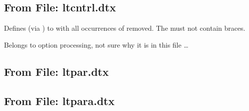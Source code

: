 \documentclass{l3in2edoc}
\begin{document}
%










\subsection{From File: ltcntrl.dtx}


\begin{function}[]
  {
    \@removeelement
  }
  \begin{syntax}
       
  \end{syntax}
  Defines  (via ) to  with all
  occurrences of  removed. The  must not
  contain braces.

  Belongs to option processing, not sure why it is in this file \ldots
\end{function}











\subsection{From File: ltpar.dtx}

\leavevmode


\subsection{From File: ltpara.dtx}
\end{document}
